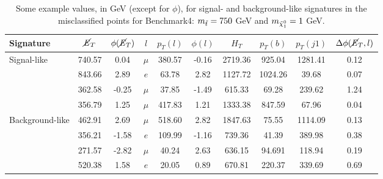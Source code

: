 \begin{table}[htbp]
    \centering
    \begin{tabular}{p{2.2cm}||c|c|c|c|c|c|c|c|c}
        \toprule
        \textbf{Signature} & $\cancel{\it{E}}_{T}$ & $\phi(\cancel{\it{E}}_{T})$ & $l$ & $p_T(l)$ & $\phi(l)$ & $H_T$ & $p_T(b)$ & $p_T(j1)$ & $\Delta \phi(\cancel{\it{E}}_{T},l)$ \\
        \midrule
        \multirow{3.75}{*}{Signal-like} & \cellcolor{gray!6}740.57 & \cellcolor{gray!6}0.04 & \cellcolor{gray!6}$\mu$ & \cellcolor{gray!6}380.57 & \cellcolor{gray!6}-0.16 & \cellcolor{gray!6}2719.36 & \cellcolor{gray!6}925.04 & \cellcolor{gray!6}1281.41 & \cellcolor{gray!6}0.12 \\
        & 843.66 & 2.89 & $e$ & 63.78 & 2.82 & 1127.72 & 1024.26 & 39.68 & 0.07 \\
        &\cellcolor{gray!6}362.58 & \cellcolor{gray!6}-0.25 & \cellcolor{gray!6}$\mu$ & \cellcolor{gray!6}37.85 & \cellcolor{gray!6}-1.49 & \cellcolor{gray!6}615.33 & \cellcolor{gray!6}69.28 & \cellcolor{gray!6}239.62 & \cellcolor{gray!6}1.24 \\
        & 356.79 & 1.25 & $\mu$ & 417.83 & 1.21 & 1333.38 & 847.59 & 67.96 & 0.04 \\
        \midrule
        \multirow{3.75}{*}{\parbox{2.2cm}{Background-like}}&\cellcolor{gray!6}462.91 & \cellcolor{gray!6}2.69 & \cellcolor{gray!6}$\mu$ & \cellcolor{gray!6}518.60 & \cellcolor{gray!6}2.82 & \cellcolor{gray!6}1847.63 & \cellcolor{gray!6}75.55 & \cellcolor{gray!6}1114.09 & \cellcolor{gray!6}0.13 \\
        & 356.21 & -1.58 & $e$ & 109.99 & -1.16 & 739.36 & 41.39 & 389.98 & 0.38 \\
        &\cellcolor{gray!6}271.57 & \cellcolor{gray!6}-2.82 & \cellcolor{gray!6}$\mu$ & \cellcolor{gray!6}40.24 & \cellcolor{gray!6}2.63 & \cellcolor{gray!6}636.15 & \cellcolor{gray!6}94.691 & \cellcolor{gray!6}118.94 & \cellcolor{gray!6}0.19 \\
        & 520.38 & 1.58 & $e$ & 20.05 & 0.89 & 670.81 & 220.37 & 339.69 & 0.69 \\
        \bottomrule
    \end{tabular}
    \caption{Some example values, in GeV (except for $\phi$), for signal- and background-like signatures in the misclassified points for Benchmark4: $m_{\Tilde{t}} = 750$ GeV and $m_{\Tilde{\chi}_1^0} = 1$ GeV.}
    \label{tab:ex_bmI}
\end{table}


